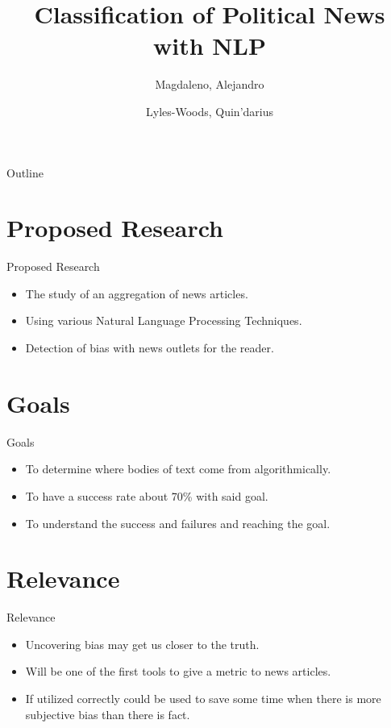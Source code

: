 \documentclass{beamer}
\title{Classification of Political News with NLP}
\author{
	Magdaleno, Alejandro\\
	\and
	Lyles-Woods, Quin'darius
}
\institute{Kennesaw State University}
\begin{document}
\frame{\titlepage}

\begin{frame}{Outline}
	\tableofcontents
\end{frame}

\section{Proposed Research}
\begin{frame}{Proposed Research}
\begin{itemize}
	\item<1-> The study of an aggregation of news articles. 		\pause
	\item<2-> Using various Natural Language Processing Techniques.     \pause
	\item<3-> Detection of bias with news outlets for the reader.
\end{itemize}
\end{frame}

\section{Goals}
\begin{frame}{Goals}
	\begin{itemize}
		\item<1-> To determine where bodies of text come from algorithmically.
		\item<2-> To have a success rate about 70\% with said goal.
		\item<3-> To understand the success and failures and reaching the goal.
	\end{itemize}
\end{frame}

\section{Relevance}
\begin{frame}{Relevance}
	\begin{itemize}
		\item<1-> Uncovering bias may get us closer to the truth.
		\item<2-> Will be one of the first tools to give a metric to news articles.
		\item<3-> If utilized correctly could be used to save some time when there is more subjective bias than there is fact.
	\end{itemize}
\end{frame}
\end{document}
